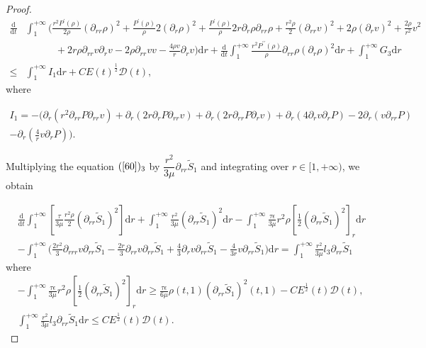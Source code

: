 \documentclass[10pt,reqno]{amsart}
\numberwithin{equation}{section}
\begin{document}
\begin{proof}
		\begin{align}\label{61}
				\frac{\mathrm{d}}{\mathrm{d} t} &\int_{1}^{+\infty}\bigg(\frac{r^2 P^{\prime}(\rho)}{2\rho} \left(\partial_{rr} \rho\right)^2+\frac{ P^{\prime}(\rho)}{\rho}2(\partial_{r}\rho)^2+\frac{P^{\prime}(\rho)}{\rho}2r\partial_{r}\rho\partial_{rr}\rho
				+\frac{r^2\rho}{2} (\partial_{rr}v)^2+2\rho(\partial_{r}v)^2+\frac{2\rho}{r^2}v^2 \nonumber\\
				&\qquad\quad+2r\rho\partial_{rr}v\partial_{r}v-2\rho\partial_{rr}v v-\frac{4\rho v}{r}\partial_{r}v\bigg)\mathrm{d}r
				+\frac{\mathrm{d}}{\mathrm{d} t}\int_{1}^{+\infty}\frac{r^2 P^{\prime\prime}(\rho)}{\rho} \partial_{rr} \rho(\partial_{r}\rho)^2\mathrm{d}r
				+\int_{1}^{+\infty}G_3\mathrm{d}r \nonumber\\
				\leq&
				\int_{1}^{+\infty}I_1\mathrm{d}r+ C E(t)^{\frac{1}{2}}\mathcal{D}(t),
		\end{align}
		where
		
	\begin{align*}				I_1=-\bigg(\partial_{r}\left(r^2\partial_{rr}P\partial_{rr}v\right) +\partial_{r}\left(2r\partial_{r}P\partial_{rr}v\right)+\partial_{r}\left(2r\partial_{rr}P\partial_{r}v\right)+
	\partial_{r}\left(4\partial_{r}v\partial_{r}P\right)-2\partial_{r}\left(v\partial_{rr}P\right)\\
	-\partial_{r}(\frac{4}{r}v\partial_{r}P)\bigg).
	\end{align*}
		
		Multiplying the equation $(\ref{60})_3$ 
		by  $\dfrac{r^2}{3\mu}\partial_{rr} \tilde{S}_1$  and  integrating over \(r \in [1, +\infty)\), we obtain
		
		\begin{equation}\label{62}
			\begin{aligned}
				&\frac{\mathrm{d}}{\mathrm{d} t}\int_{1}^{+\infty}\left[\frac{\tau}{3 \mu} \frac{r^2 \rho}{2}(\partial_{rr} \tilde{S}_1)^2\right]\mathrm{d}r
				+\int_{1}^{+\infty}\frac{r^2}{3 \mu}(\partial_{rr} \tilde{S}_1)^2\mathrm{d}r
				-\int_{1}^{+\infty}
				\frac{\tau\epsilon}{3 \mu}r^2\rho [\frac{1}{2}(\partial_{rr}\tilde{S}_1)^2]_r\mathrm{d}r\\
				&-\int_{1}^{+\infty}\bigg(\frac{2r^2}{3}\partial_{rrr} v\partial_{rr} \tilde{S}_1- \frac{2r}{3}\partial_{rr} v\partial_{rr}\tilde{S}_1
				+\frac{4}{3} \partial_{r}v\partial_{rr} \tilde{S}_1-\frac{4}{3r}v\partial_{rr} \tilde{S}_1
				\bigg)\mathrm{d}r
				=\int_{1}^{+\infty}\frac{r^2}{3\mu}l_3\partial_{rr} \tilde{S}_1
			\end{aligned}
		\end{equation}
		where
		\begin{equation}\nonumber
			\begin{aligned}
				&-\int_{1}^{+\infty}
				\frac{\tau\epsilon}{3 \mu}r^2\rho[\frac{1}{2}(\partial_{rr}\tilde{S}_1)^2]_r\mathrm{d}r
				\geq \frac{\tau\epsilon}{6 \mu}\rho(t,1)(\partial_{rr}\tilde{S}_1)^2(t,1)
				- C E^{\frac{1}{2}}(t) \mathcal{D}(t),\\
				&\int_{1}^{+\infty}\frac{r^2}{3\mu}l_3\partial_{rr} \tilde{S}_1\mathrm{d}r
				\leq C E^{\frac{1}{2}}(t) \mathcal{D}(t).
			\end{aligned}
		\end{equation}
		

\end{proof}
\end{document}
